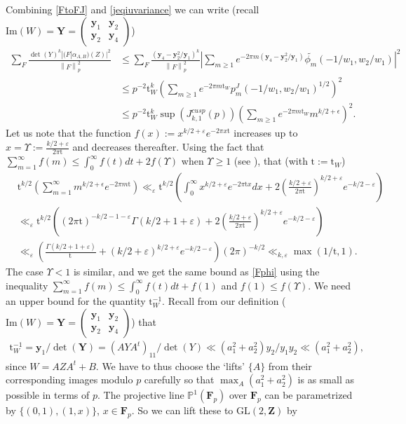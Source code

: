 \documentclass[11pt]{amsart}
\numberwithin{equation}{section}
\theoremstyle{plain}
\theoremstyle{definition}
\newcommand{\mf}{\mathbf}
\newcommand{\mrm}{\mathrm}
\newcommand{\im}{\mrm{Im}}
\newcommand*{\norm}[1]{\left\lVert#1\right\rVert}
\newcommand{\lbr}{\left(}
\newcommand{\rbr}{\right)}
\newcommand{\n}{\nonumber}
\newcommand{\sumn}{\sum \nolimits}
\newcommand{\smat}[4]{\left( \begin{smallmatrix}#1&#2\\#3&#4\end{smallmatrix}\right)}
\newcommand{\GL}{\mrm{GL}}
\newcommand{\pfp}{\mf F_p}
\newcommand{\jkp}{J_{k,1}^{cusp}(p)}
\newcommand{\tw}{{\mrm t}_W}
\newcommand{\my}{\mf y}
\begin{document}
Combining \eqref{FtoFJ} and \eqref{jeqiuvariance} we can write (recall $\im(W)= \mf Y = \smat{\my_1}{\my_2}{\my_2}{\my_4}$)  
\begin{align}
    \sum_F \frac{\det(Y)^{k} |(F | \alpha_{A,B})(Z)|^2}{\norm{F}^2_p}
    & \le \sum_F\frac{(\my_4-\my_2^2/\my_1)^{k}}{\norm{F}^2_p} |\sumn_{m \ge 1} e^{-2\pi m(\my_4- \my_2^2/\my_1)} \widetilde{\phi_m}(-1/w_1, w_2/w_1)|^2 \\
    &\le p^{-2}\tw^{k} (\sumn_{m \ge 1} e^{-2\pi m\tw} p_m^J(-1/w_1, w_2/w_1)^{1/2})^2 \\
    & \le p^{-2} \tw^{k} \sup(\jkp) (\sumn_{m \ge 1} e^{-2\pi m\tw} m^{k/2+\epsilon} )^2 .\label{klnparab1}
\end{align}
Let us note that the function $f(x):=x^{k/2+\varepsilon}e^{-2 \pi  x\mrm t}$ increases up to $x=\Upsilon:= \frac{k/2+\varepsilon}{ 2 \pi \mrm t} $ and decreases thereafter. Using the fact that $\sum_{m=1}^\infty f(m) \leq \int_0^\infty f(t) dt + 2 f(\Upsilon)$ when $   \Upsilon \geq 1$ (see \cite{Xia}), that (with $ \mrm t := \tw$)
\begin{align}
& {\mrm t}^{k/2} \lbr \sum_{m=1}^\infty m^{k/2+\epsilon}  e^{-2 \pi m {\mrm t}}  \rbr 
\ll_\varepsilon {\mrm t}^{k/2} \lbr  \int_0^\infty x^{k/2+\varepsilon} e^{-2 \pi {\mrm t} x} dx + 2 (\frac{k/2+\varepsilon}{2 \pi {\mrm t}} )^{k/2+\varepsilon} e^{-   k/2 -\varepsilon} \rbr 
\\
& \ll_\varepsilon {\mrm t}^{k/2} \lbr (2 \pi {\mrm t})^{-k/2-1-\varepsilon} \Gamma(k/2+1+\varepsilon)  + 2 (\frac{k/2+\varepsilon}{2 \pi {\mrm t} } )^{k/2+\varepsilon} e^{-   k/2 -\varepsilon}  \rbr  \n \\
& \ll_\varepsilon \lbr \frac{\Gamma(k/2+1+\varepsilon)  }{ {\mrm t} \, }   + (k/2+\varepsilon)^{k/2+\varepsilon} e^{-   k/2 -\varepsilon}  \rbr (2 \pi)^{-k/2} 
 \ll_{k, \varepsilon} \max(1/ \mrm{t}, 1).
\label{Fphi}
\end{align}
The case $  \Upsilon < 1$ is similar, and we get the same bound as \eqref{Fphi} using the inequality $\sum_{m=1}^\infty f(m) \leq \int_0^\infty f(t) dt + f(1)$ and $f(1) \leq  f(\Upsilon)$. 
We need an upper bound for the quantity $\tw^{-1}$. Recall from our definition ($\im(W)= \mf Y = \smat{\my_1}{\my_2}{\my_2}{\my_4}$) that 
\begin{align}
\tw^{-1} =  \my_1 / \det( \mf Y)= (AYA^t)_{11}/ \det(Y) \ll (a_1^2+a_2^2) y_2/y_1y_2 \ll (a_1^2+a_2^2),
\end{align}
since $W=AZA^t+B$. We have to thus choose the `lifts' $\{A\}$ from their corresponding images modulo $p$ carefully so that $\max_{A}(a_1^2+a_2^2)$ is as small as possible in terms of $p$. The projective line $\mathbb P^1(\pfp)$ over $\pfp$ can be parametrized by $\{ (0,1), (1,x)\}$, $x \in \pfp$. So we can lift these to $\GL(2, \mf Z)$ by
\end{document}
